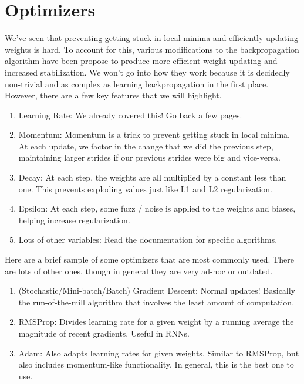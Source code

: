 \documentclass{article}
\begin{document}
\section{Optimizers}
    We've seen that preventing getting stuck in local minima and efficiently updating weights is hard. To account for this, various modifications to the backpropagation algorithm have been propose to produce more efficient weight updating and increased stabilization. We won't go into how they work because it is decidedly non-trivial and as complex as learning backpropagation in the first place. However, there are a few key features that we will highlight.
    
    \begin{enumerate}
        \item Learning Rate: We already covered this! Go back a few pages.
        \item Momentum: Momentum is a trick to prevent getting stuck in local minima. At each update, we factor in the change that we did the previous step, maintaining larger strides if our previous strides were big and vice-versa.
        \item Decay: At each step, the weights are all multiplied by a constant less than one. This prevents exploding values just like L1 and L2 regularization.
        \item Epsilon: At each step, some fuzz / noise is applied to the weights and biases, helping increase regularization.
        \item Lots of other variables: Read the documentation for specific algorithms.
    \end{enumerate}
    
    Here are a brief sample of some optimizers that are most commonly used. There are lots of other ones, though in general they are very ad-hoc or outdated.
    
    \begin{enumerate}
        \item (Stochastic/Mini-batch/Batch) Gradient Descent: Normal updates! Basically the run-of-the-mill algorithm that involves the least amount of computation.
        \item RMSProp: Divides learning rate for a given weight by a running average the magnitude of recent gradients. Useful in RNNs.
        \item Adam: Also adapts learning rates for given weights. Similar to RMSProp, but also includes momentum-like functionality. In general, this is the best one to use.
    \end{enumerate}
\end{document}
